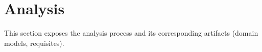 
\section{Analysis}

This section exposes the analysis process and its corresponding artifacts (domain models, requisites).  




